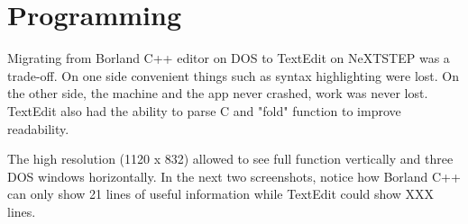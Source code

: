 
\section{Programming}
Migrating from Borland C++ editor on DOS to TextEdit on NeXTSTEP was a trade-off. On one side convenient things such as syntax highlighting were lost. On the other side, the machine and the app never crashed, work was never lost. TextEdit also had the ability to parse C and "fold" function to improve readability.\\
\par
 The high resolution (1120 x 832) allowed to see full function vertically and three DOS windows horizontally. In the next two screenshots, notice how Borland C++ can only show 21 lines of useful information while TextEdit could show XXX lines.\\
\par
{}
\par
{}

